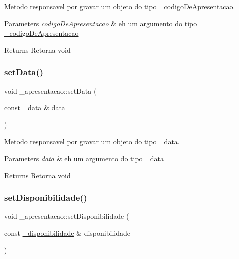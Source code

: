 Metodo responsavel por gravar um objeto do tipo \mbox{\hyperlink{class__codigo_de_apresentacao}{\+\_\+codigo\+De\+Apresentacao}}. 


\begin{DoxyParams}{Parameters}
{\em codigo\+De\+Apresentacao} & eh um argumento do tipo \mbox{\hyperlink{class__codigo_de_apresentacao}{\+\_\+codigo\+De\+Apresentacao}} \\
\hline
\end{DoxyParams}
\begin{DoxyReturn}{Returns}
Retorna void 
\end{DoxyReturn}
\mbox{\label{class__apresentacao_af74b2958dda02a2a76075057f66ddc7b}} 
\subsubsection{\texorpdfstring{setData()}{setData()}}
{\footnotesize\ttfamily void \+\_\+apresentacao\+::set\+Data (\begin{DoxyParamCaption}\item[{const \mbox{\hyperlink{class__data}{\+\_\+data}} \&}]{data }\end{DoxyParamCaption})}



Metodo responsavel por gravar um objeto do tipo \mbox{\hyperlink{class__data}{\+\_\+data}}. 


\begin{DoxyParams}{Parameters}
{\em data} & eh um argumento do tipo \mbox{\hyperlink{class__data}{\+\_\+data}} \\
\hline
\end{DoxyParams}
\begin{DoxyReturn}{Returns}
Retorna void 
\end{DoxyReturn}
\mbox{\label{class__apresentacao_a32881d74b3c5652ac5efbd9fb2323464}} 
\subsubsection{\texorpdfstring{setDisponibilidade()}{setDisponibilidade()}}
{\footnotesize\ttfamily void \+\_\+apresentacao\+::set\+Disponibilidade (\begin{DoxyParamCaption}\item[{const \mbox{\hyperlink{class__disponibilidade}{\+\_\+disponibilidade}} \&}]{disponibilidade }\end{DoxyParamCaption})}



